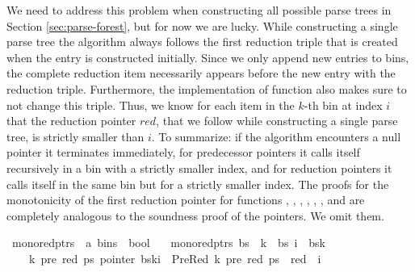 \begin{isabellebody}
\begin{isamarkuptext}
We need to address this problem when constructing all possible parse trees in Section \ref{sec:parse-forest},
but for now we are lucky. While constructing a single parse tree the algorithm always follows the
first reduction triple that is created when the entry is constructed initially. Since we only
append new entries to bins, the complete reduction item necessarily appears before the new entry with
the reduction triple. Furthermore, the implementation of function  also makes sure to not change this
triple. Thus, we know for each item in the $k$-th bin at index $i$ that the reduction pointer $red$,
that we follow while constructing a single parse tree, is strictly smaller than $i$. To summarize:
if the algorithm encounters a null pointer it terminates immediately, for predecessor pointers it
calls itself recursively in a bin with a strictly smaller index, and for reduction pointers it calls
itself in the same bin but for a strictly smaller index. The proofs for the monotonicity of the first
reduction pointer for functions , , , ,
, , and  are completely analogous to
the soundness proof of the pointers. We omit them.%
\end{isamarkuptext}\isamarkuptrue%
\isamarkupfalse%
\ mono{\isacharunderscore}{\kern0pt}red{\isacharunderscore}{\kern0pt}ptrs\ {\isacharcolon}{\kern0pt}{\isacharcolon}{\kern0pt}\ {\isachardoublequoteopen}{\isacharprime}{\kern0pt}a\ bins\ {\isasymRightarrow}\ bool{\isachardoublequoteclose}\ \isanewline
\ \ {\isachardoublequoteopen}mono{\isacharunderscore}{\kern0pt}red{\isacharunderscore}{\kern0pt}ptrs\ bs\ {\isasymequiv}\ {\isasymforall}k\ {\isacharless}{\kern0pt}\ {\isacharbar}{\kern0pt}bs{\isacharbar}{\kern0pt}{\isachardot}{\kern0pt}\ {\isasymforall}i\ {\isacharless}{\kern0pt}\ {\isacharbar}{\kern0pt}bs{\isacharbang}{\kern0pt}k{\isacharbar}{\kern0pt}{\isachardot}{\kern0pt}\isanewline
\ \ \ \ {\isasymforall}k{\isacharprime}{\kern0pt}\ pre\ red\ ps{\isachardot}{\kern0pt}\ pointer\ {\isacharparenleft}{\kern0pt}bs{\isacharbang}{\kern0pt}k{\isacharbang}{\kern0pt}i{\isacharparenright}{\kern0pt}\ {\isacharequal}{\kern0pt}\ PreRed\ {\isacharparenleft}{\kern0pt}k{\isacharprime}{\kern0pt}{\isacharcomma}{\kern0pt}\ pre{\isacharcomma}{\kern0pt}\ red{\isacharparenright}{\kern0pt}\ ps\ {\isasymlongrightarrow}\ red\ {\isacharless}{\kern0pt}\ i{\isachardoublequoteclose}%

\end{isabellebody}
